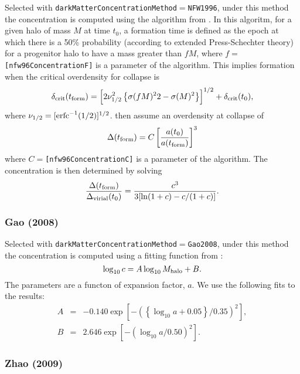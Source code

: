 Selected with {\tt darkMatterConcentrationMethod}$=${\tt NFW1996}, under this method the concentration is computed using the algorithm from \cite{navarro_structure_1996}. In this algoritm, for a given halo of mass $M$ at time $t_0$, a formation time is defined as the epoch at which there is a 50\% probability (according to extended Press-Schechter theory) for a progenitor halo to have a mass greater than $fM$, where $f=${\tt [nfw96ConcentrationF]} is a parameter of the algorithm. This implies formation when the critical overdensity for collapse is
\begin{equation}
 \delta_{\rm crit}(t_{\rm form}) = \left[ 2 \nu_{1/2}^2 \left\{\sigma(fM)^22-\sigma(M)^2\right\} \right]^{1/2}+\delta_{\rm crit}(t_0),
\end{equation}
where $\nu_{1/2} = [\hbox{erfc}^{-1}(1/2)]^{1/2}$. \cite{navarro_structure_1996} then assume an overdensity at collapse of 
\begin{equation}
 \Delta(t_{\rm form}) = C  \left[ {a(t_0) \over a(t_{\rm form})} \right]^3
\end{equation}
where $C=${\tt [nfw96ConcentrationC]} is a parameter of the algorithm. The concentration is then determined by solving
\begin{equation}
 {\Delta(t_{\rm form}) \over \Delta_{\rm virial}(t_0)} = {c^3 \over 3 [\ln(1+c)-c/(1+c)]}.
\end{equation}

\subsubsection{Gao (2008)}

Selected with {\tt darkMatterConcentrationMethod}$=${\tt Gao2008}, under this method the concentration is computed using a fitting function from \cite{gao_redshift_2008}:
\begin{equation}
\log_{10} c = A \log_{10} M_{\rm halo} + B.
\end{equation}
The parameters are a functon of expansion factor, $a$. We use the following fits to the \cite{gao_redshift_2008} results:
\begin{eqnarray}
A &=& -0.140 \exp\left[-\left(\left\{\log_{10}a+0.05\right\}/0.35\right)^2\right], \\
B &=&  2.646 \exp\left[-\left(\log_{10}a/0.50\right)^2\right].
\end{eqnarray}

\subsubsection{Zhao (2009)}


